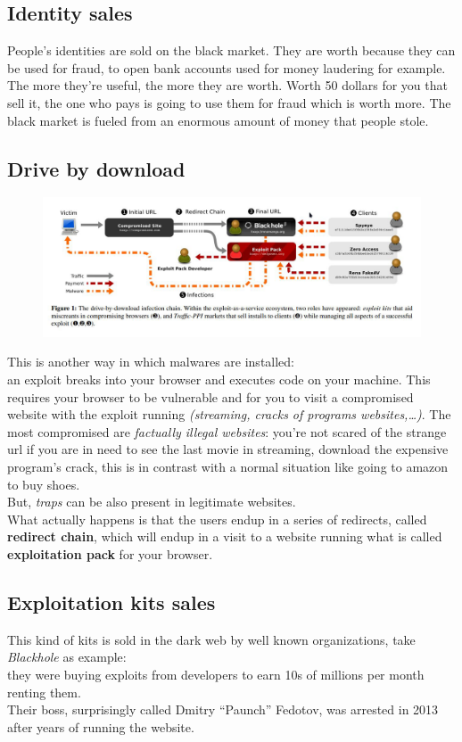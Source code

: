    \subsection{Identity sales}
        People's identities are sold on the black market. They are worth because they can be used for fraud, to open bank accounts used for money laudering for example.
        The more they're useful, the more they are worth.
        Worth 50 dollars for you that sell it, the one who pays is going to use them for fraud which is worth more.
        The black market is fueled from an enormous amount of money that people stole.
    \subsection{Drive by download}
        \begin{figure}[ht!]
            \centering
            \includegraphics[width=0.6\linewidth]{drivebydownload.png}
        \end{figure}
        This is another way in which malwares are installed:\\
        an exploit breaks into your browser and executes code on your machine. This requires your browser to be vulnerable and for you to visit a compromised website with the exploit running \textit{(streaming, cracks of programs websites,\dots)}.
        The most compromised are \textit{factually illegal websites}: you're not scared of the strange url if you are in need to see the last movie in streaming, download the expensive program's crack, this is in contrast with a normal situation like going to amazon to buy shoes.\\
        But, \textit{traps} can be also present in legitimate websites.\\
        What actually happens is that the users endup in a series of redirects, called \textbf{redirect chain}, which will endup in a visit to a website running what is called \textbf{exploitation pack} for your browser.
    \subsection{Exploitation kits sales}
        This kind of kits is sold in the dark web by well known organizations, take \textit{Blackhole} as example:\\
        they were buying exploits from developers to earn 10s of millions per month renting them.\\
        Their boss, surprisingly called Dmitry “Paunch” Fedotov, was arrested in 2013 after years of running the website.
